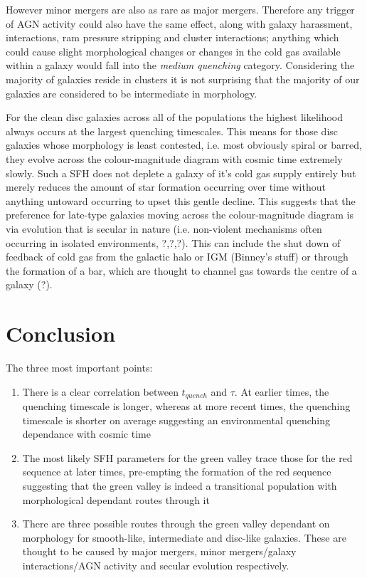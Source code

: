 \documentclass{mn2e}
\begin{document}
However minor mergers are also as rare as major mergers. Therefore any trigger of AGN activity could also have the same effect, along with galaxy harassment, interactions, ram pressure stripping and cluster interactions; anything which could cause slight morphological changes or changes in the cold gas available within a galaxy would fall into the \emph{medium quenching} category. Considering the majority of galaxies reside in clusters it is not surprising that the majority of our galaxies are considered to be intermediate in morphology. 

For the clean disc galaxies across all of the populations the highest likelihood always occurs at the largest quenching timescales. This means for those disc galaxies whose morphology is least contested, i.e. most obviously spiral or barred, they evolve across the colour-magnitude diagram with cosmic time extremely slowly. Such a SFH does not deplete a galaxy of it's cold gas supply entirely but merely reduces the amount of star formation occurring over time without anything untoward occurring to upset this gentle decline. This suggests that the preference for late-type galaxies moving across the colour-magnitude diagram is via evolution that is secular in nature (i.e. non-violent mechanisms often occurring in isolated environments, ?,?,?). This can include the shut down of feedback of cold gas from the galactic halo or IGM (Binney's stuff) or through the formation of a bar, which are thought to channel gas towards the centre of a galaxy (?). 


\section{Conclusion}\label{conc}
The three most important points: 
\begin{enumerate}
\item There is a clear correlation between $t_{quench}$ and $\tau$. At earlier times, the quenching timescale is longer, whereas at more recent times, the quenching timescale is shorter on average suggesting an environmental quenching dependance with cosmic time
\item The most likely SFH parameters for the green valley trace those for the red sequence at later times, pre-empting the formation of the red sequence suggesting that the green valley is indeed a transitional population with morphological dependant routes through it
\item There are three possible routes through the green valley dependant on morphology for smooth-like, intermediate and disc-like galaxies. These are thought to be caused by major mergers, minor mergers/galaxy interactions/AGN activity and secular evolution respectively.
\end{enumerate}
\end{document}
